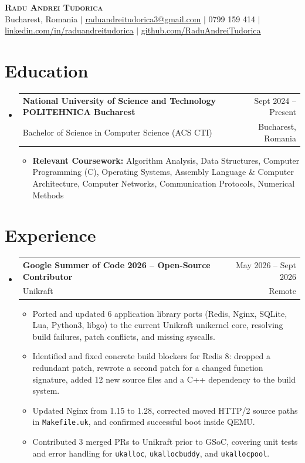 \documentclass[letterpaper,11pt]{article}
\makeatletter
\newcommand{\resumeItem}[1]{
  \item\small{
    {#1 \vspace{-2pt}}
  }
}
\newcommand{\resumeSubheading}[4]{
  \vspace{-2pt}\item
    \begin{tabular*}{0.97\textwidth}[t]{l@{\extracolsep{\fill}}r}
      \textbf{#1} & #2 \\
      \small#3 & \small #4 \\
    \end{tabular*}\vspace{-7pt}
}
\newcommand{\resumeSubHeadingListStart}{\begin{itemize}[leftmargin=0.15in, label={}]}
\newcommand{\resumeSubHeadingListEnd}{\end{itemize}}
\newcommand{\resumeItemListStart}{\begin{itemize}}
\newcommand{\resumeItemListEnd}{\end{itemize}\vspace{-5pt}}
\makeatother
\begin{document}
\begin{center}
    \textbf{\Huge \scshape Radu Andrei Tudorica} \\ \vspace{1pt}
    \small Bucharest, Romania $|$
    \href{mailto:raduandreitudorica3@gmail.com}{\underline{raduandreitudorica3@gmail.com}} $|$
    \small 0799 159 414 $|$
    \href{https://linkedin.com/in/raduandreitudorica}{\underline{linkedin.com/in/raduandreitudorica}} $|$
    \href{https://github.com/RaduAndreiTudorica}{\underline{github.com/RaduAndreiTudorica}}
\end{center}


\section{Education}
  \resumeSubHeadingListStart
    \resumeSubheading
      {National University of Science and Technology POLITEHNICA Bucharest}{Sept 2024 -- Present}
      {Bachelor of Science in Computer Science (ACS CTI)}{Bucharest, Romania}
      \resumeItemListStart
        \resumeItem{\textbf{Relevant Coursework:} Algorithm Analysis, Data Structures, Computer Programming (C), Operating Systems, Assembly Language \& Computer Architecture, Computer Networks, Communication Protocols, Numerical Methods}
      \resumeItemListEnd
  \resumeSubHeadingListEnd


\section{Experience}
  \resumeSubHeadingListStart
    \resumeSubheading
      {Google Summer of Code 2026 -- Open-Source Contributor}{May 2026 -- Sept 2026}
      {Unikraft}{Remote}
      \resumeItemListStart
        \resumeItem{Ported and updated 6 application library ports (Redis, Nginx, SQLite, Lua, Python3, libgo) to the current Unikraft unikernel core, resolving build failures, patch conflicts, and missing syscalls.}
        \resumeItem{Identified and fixed concrete build blockers for Redis 8: dropped a redundant patch, rewrote a second patch for a changed function signature, added 12 new source files and a C++ dependency to the build system.}
        \resumeItem{Updated Nginx from 1.15 to 1.28, corrected moved HTTP/2 source paths in \texttt{Makefile.uk}, and confirmed successful boot inside QEMU.}
        \resumeItem{Contributed 3 merged PRs to Unikraft prior to GSoC, covering unit tests and error handling for \texttt{ukalloc}, \texttt{ukallocbuddy}, and \texttt{ukallocpool}.}
      \resumeItemListEnd
  \resumeSubHeadingListEnd
\end{document}
